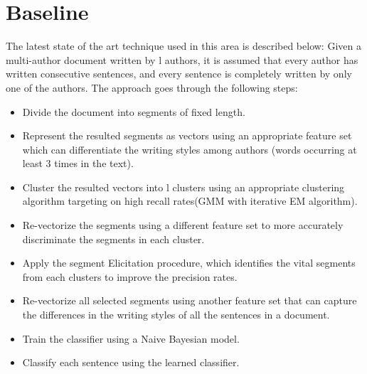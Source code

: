 \documentclass[letterpaper]{article}
\begin{document}

\section{Baseline}
The latest state of the art technique used in this area is described below:
Given a multi-author document written by l authors, it is assumed that every author has written consecutive sentences, and every sentence is completely written by only one of the authors. The approach goes through the following steps:
\begin{itemize}
\item Divide the document into segments of fixed length.
\item Represent the resulted segments as vectors using an appropriate feature set which can differentiate the writing styles among authors (words occurring at least 3 times in the text).
\item Cluster the resulted vectors into l clusters using an appropriate clustering algorithm targeting on high recall rates(GMM with iterative EM algorithm).
\item Re-vectorize the segments using a different feature set to more accurately discriminate the segments in each cluster.
\item Apply the segment Elicitation procedure, which identifies the vital segments from each clusters to improve the precision rates.
\item Re-vectorize all selected segments using another feature set that can capture the differences in the writing styles of all the sentences in a document.
\item Train the classifier using a Naive Bayesian model.
\item Classify each sentence using the learned classifier.
\end{itemize}
\end{document}
